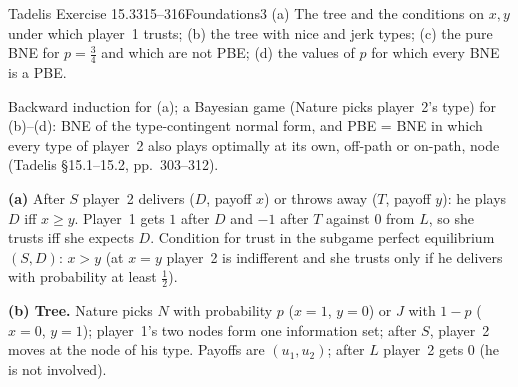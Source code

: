 \begin{exsol}{Tadelis Exercise 15.3}{315--316}{Foundations}{3}
\asked (a) The tree and the conditions on $x, y$ under which player~1 trusts; (b) the tree with
nice and jerk types; (c) the pure BNE for $p = \frac34$ and which are not PBE; (d) the values of
$p$ for which every BNE is a PBE.

\method Backward induction for (a); a Bayesian game (Nature picks player~2's type) for (b)--(d):
BNE of the type-contingent normal form, and PBE = BNE in which every type of player~2 also
plays optimally at its own, off-path or on-path, node (Tadelis \S15.1--15.2, pp.~303--312).

\solution \textbf{(a)} After $S$ player~2 delivers ($D$, payoff $x$) or throws away ($T$, payoff
$y$): he plays $D$ iff $x \ge y$. Player~1 gets $1$ after $D$ and $-1$ after $T$ against $0$ from
$L$, so she trusts iff she expects $D$. Condition for trust in the subgame perfect equilibrium
$(S, D)$: $x > y$ (at $x = y$ player~2 is indifferent and she trusts only if he delivers with
probability at least $\frac12$).

\textbf{(b) Tree.} Nature picks $N$ with probability $p$ ($x = 1$, $y = 0$) or $J$ with $1-p$
($x = 0$, $y = 1$); player~1's two nodes form one information set; after $S$, player~2 moves at
the node of his type. Payoffs are $(u_1, u_2)$; after $L$ player~2 gets $0$ (he is not involved).
\begin{center}
\end{center}


\end{exsol}
